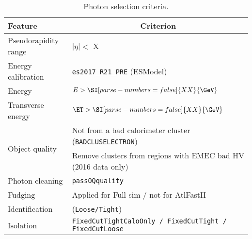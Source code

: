 \begin{table}[ht]
  \caption{Photon selection criteria.}%
  \label{tab:object:electron} 
  \centering
  \begin{tabular}{ll}
    \toprule
    Feature & \multicolumn{1}{c}{Criterion} \\
    \midrule
    Pseudorapidity range & \(|\eta| <\) X\\
    Energy calibration & \texttt{es2017\_R21\_PRE} (ESModel)\\
    Energy & \(E > \SI[parse-numbers=false]{XX}{\GeV}\) \\
    Transverse energy & \(\ET > \SI[parse-numbers=false]{XX}{\GeV}\) \\
    \midrule
    \multirow{2}{*}{Object quality} & Not from a bad calorimeter cluster (\texttt{BADCLUSELECTRON})\\ %
      & Remove clusters from regions with EMEC bad HV (2016 data only) \\
    \midrule
    Photon cleaning & \texttt{passOQquality} \\
    Fudging & Applied for Full sim / not for AtlFastII \\
    \midrule
    Identification & (\texttt{Loose/Tight}) \\
    Isolation &  \texttt{FixedCutTightCaloOnly / FixedCutTight / FixedCutLoose} \\
    \bottomrule
  \end{tabular}
\end{table}

